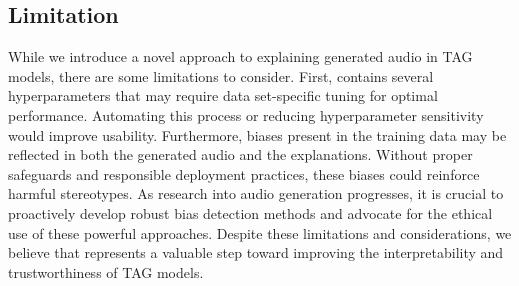 \subsection{Limitation}
\label{app:limication}
While we introduce a novel approach to explaining generated audio in TAG models, there are some limitations to consider. First, \mname{} contains several hyperparameters that may require data set-specific tuning for optimal performance. Automating this process or reducing hyperparameter sensitivity would improve usability. Furthermore, biases present in the training data may be reflected in both the generated audio and the explanations. Without proper safeguards and responsible deployment practices, these biases could reinforce harmful stereotypes. As research into audio generation progresses, it is crucial to proactively develop robust bias detection methods and advocate for the ethical use of these powerful approaches. Despite these limitations and considerations, we believe that \mname{} represents a valuable step toward improving the interpretability and trustworthiness of TAG models.
